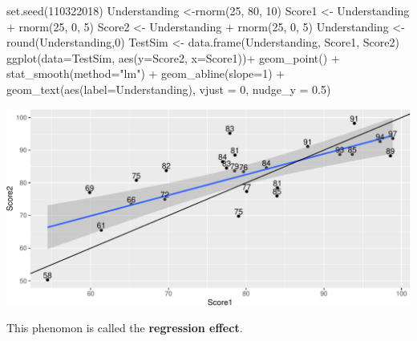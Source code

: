 \documentclass[
  letterpaper,
  DIV=11,
  numbers=noendperiod]{scrreprt}
\newenvironment{Shaded}{\begin{snugshade}}{\end{snugshade}}
\newcommand{\AttributeTok}[1]{\textcolor[rgb]{0.40,0.45,0.13}{#1}}
\newcommand{\DecValTok}[1]{\textcolor[rgb]{0.68,0.00,0.00}{#1}}
\newcommand{\FloatTok}[1]{\textcolor[rgb]{0.68,0.00,0.00}{#1}}
\newcommand{\FunctionTok}[1]{\textcolor[rgb]{0.28,0.35,0.67}{#1}}
\newcommand{\NormalTok}[1]{\textcolor[rgb]{0.00,0.23,0.31}{#1}}
\newcommand{\OtherTok}[1]{\textcolor[rgb]{0.00,0.23,0.31}{#1}}
\newcommand{\SpecialCharTok}[1]{\textcolor[rgb]{0.37,0.37,0.37}{#1}}
\newcommand{\StringTok}[1]{\textcolor[rgb]{0.13,0.47,0.30}{#1}}
\begin{document}
\begin{Shaded}
\begin{Highlighting}[]
\FunctionTok{set.seed}\NormalTok{(}\DecValTok{110322018}\NormalTok{)}
\NormalTok{Understanding }\OtherTok{\textless{}{-}}\FunctionTok{rnorm}\NormalTok{(}\DecValTok{25}\NormalTok{, }\DecValTok{80}\NormalTok{, }\DecValTok{10}\NormalTok{)}
\NormalTok{Score1 }\OtherTok{\textless{}{-}}\NormalTok{ Understanding }\SpecialCharTok{+} \FunctionTok{rnorm}\NormalTok{(}\DecValTok{25}\NormalTok{, }\DecValTok{0}\NormalTok{, }\DecValTok{5}\NormalTok{)}
\NormalTok{Score2 }\OtherTok{\textless{}{-}}\NormalTok{ Understanding }\SpecialCharTok{+} \FunctionTok{rnorm}\NormalTok{(}\DecValTok{25}\NormalTok{, }\DecValTok{0}\NormalTok{, }\DecValTok{5}\NormalTok{)}
\NormalTok{Understanding }\OtherTok{\textless{}{-}} \FunctionTok{round}\NormalTok{(Understanding,}\DecValTok{0}\NormalTok{)}
\NormalTok{TestSim }\OtherTok{\textless{}{-}} \FunctionTok{data.frame}\NormalTok{(Understanding, Score1, Score2)}
\FunctionTok{ggplot}\NormalTok{(}\AttributeTok{data=}\NormalTok{TestSim, }\FunctionTok{aes}\NormalTok{(}\AttributeTok{y=}\NormalTok{Score2, }\AttributeTok{x=}\NormalTok{Score1))}\SpecialCharTok{+} \FunctionTok{geom\_point}\NormalTok{() }\SpecialCharTok{+} \FunctionTok{stat\_smooth}\NormalTok{(}\AttributeTok{method=}\StringTok{"lm"}\NormalTok{) }\SpecialCharTok{+}
  \FunctionTok{geom\_abline}\NormalTok{(}\AttributeTok{slope=}\DecValTok{1}\NormalTok{) }\SpecialCharTok{+} \FunctionTok{geom\_text}\NormalTok{(}\FunctionTok{aes}\NormalTok{(}\AttributeTok{label=}\NormalTok{Understanding), }\AttributeTok{vjust =} \DecValTok{0}\NormalTok{, }\AttributeTok{nudge\_y =} \FloatTok{0.5}\NormalTok{)}
\end{Highlighting}
\end{Shaded}

\includegraphics{Ch4_files/figure-pdf/unnamed-chunk-90-1.pdf}

This phenomon is called the \textbf{regression effect}.
\end{document}
